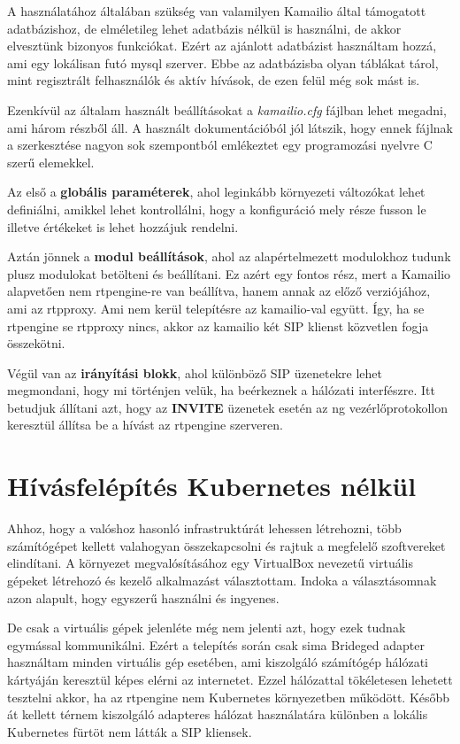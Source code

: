 A használatához általában szükség van valamilyen Kamailio által támogatott adatbázishoz,
de elméletileg lehet adatbázis nélkül is használni, de akkor elvesztünk bizonyos funkciókat. 
Ezért az ajánlott adatbázist használtam hozzá, ami egy lokálisan futó mysql szerver. Ebbe 
az adatbázisba olyan táblákat tárol, mint regisztrált felhasználók és aktív hívások, de 
ezen felül még sok mást is. 

Ezenkívül az általam használt beállításokat a \textit{kamailio.cfg} fájlban lehet megadni,
ami három részből áll. A használt dokumentációból \cite{kamailio} jól látszik, hogy ennek
fájlnak a szerkesztése nagyon sok szempontból emlékeztet egy programozási nyelvre 
C szerű elemekkel.  

Az első a \textbf{globális paraméterek}, ahol leginkább környezeti változókat lehet 
definiálni, amikkel lehet kontrollálni, hogy a konfiguráció mely része fusson le illetve
értékeket is lehet hozzájuk rendelni. 

Aztán jönnek a \textbf{modul beállítások}, ahol az alapértelmezett modulokhoz tudunk plusz
modulokat betölteni és beállítani. Ez azért egy fontos rész, mert a Kamailio alapvetően 
nem rtpengine-re van beállítva, hanem annak az előző verziójához, ami az rtpproxy. Ami 
nem kerül telepítésre az kamailio-val együtt. Így, ha se rtpengine se rtpproxy nincs,
akkor az kamailio két SIP klienst közvetlen fogja összekötni.

Végül van az \textbf{irányítási blokk}, ahol különböző SIP üzenetekre lehet megmondani, hogy mi
történjen velük, ha beérkeznek a hálózati interfészre. Itt betudjuk állítani azt, hogy
az \textbf{INVITE} üzenetek esetén az ng vezérlőprotokollon keresztül állítsa be a hívást
az rtpengine szerveren.

\section{Hívásfelépítés Kubernetes nélkül}

Ahhoz, hogy a valóshoz hasonló infrastruktúrát lehessen létrehozni, több 
számítógépet kellett valahogyan összekapcsolni és rajtuk a megfelelő szoftvereket
elindítani. A környezet megvalósításához egy VirtualBox nevezetű virtuális gépeket
létrehozó és kezelő alkalmazást választottam. Indoka a választásomnak azon
alapult, hogy egyszerű használni és ingyenes.

De csak a virtuális gépek jelenléte még nem jelenti azt, hogy ezek tudnak egymással
kommunikálni. Ezért a telepítés során csak sima Brideged adapter használtam minden
virtuális gép esetében, ami kiszolgáló számítógép hálózati kártyáján keresztül
képes elérni az internetet. Ezzel hálózattal tökéletesen lehetett tesztelni
akkor, ha az rtpengine nem Kubernetes környezetben működött. Később át kellett
térnem kiszolgáló adapteres hálózat használatára különben a lokális Kubernetes 
fürtöt nem látták a SIP kliensek. 

